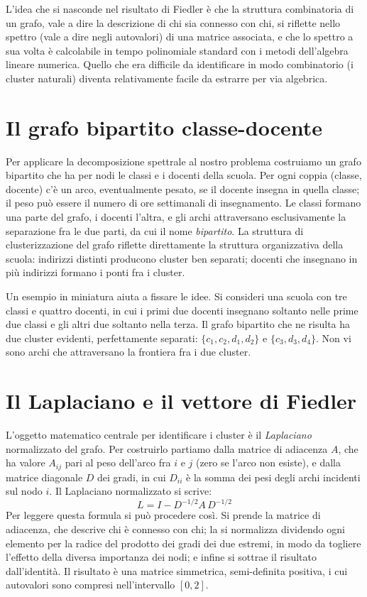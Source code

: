 L'idea che si nasconde nel risultato di Fiedler \`e che la
struttura combinatoria di un grafo, vale a dire la
descrizione di chi sia connesso con chi, si riflette nello
spettro (vale a dire negli autovalori) di una matrice
associata, e che lo spettro a sua volta \`e calcolabile in
tempo polinomiale standard con i metodi dell'algebra
lineare numerica. Quello che era difficile da identificare
in modo combinatorio (i cluster naturali) diventa
relativamente facile da estrarre per via algebrica.

\section{Il grafo bipartito classe-docente}

Per applicare la decomposizione spettrale al nostro problema
costruiamo un grafo bipartito che ha per nodi le classi e i
docenti della scuola. Per ogni coppia (classe, docente) c'\`e
un arco, eventualmente pesato, se il docente insegna in
quella classe; il peso pu\`o essere il numero di ore
settimanali di insegnamento. Le classi formano una parte del
grafo, i docenti l'altra, e gli archi attraversano
esclusivamente la separazione fra le due parti, da cui il
nome \emph{bipartito}. La struttura di clusterizzazione del
grafo riflette direttamente la struttura organizzativa della
scuola: indirizzi distinti producono cluster ben separati;
docenti che insegnano in pi\`u indirizzi formano i ponti fra
i cluster.

Un esempio in miniatura aiuta a fissare le idee. Si consideri
una scuola con tre classi e quattro docenti, in cui i primi
due docenti insegnano soltanto nelle prime due classi e gli
altri due soltanto nella terza. Il grafo bipartito che ne
risulta ha due cluster evidenti, perfettamente separati:
$\{c_1, c_2, d_1, d_2\}$ e $\{c_3, d_3, d_4\}$. Non vi sono
archi che attraversano la frontiera fra i due cluster.

\section{Il Laplaciano e il vettore di Fiedler}

L'oggetto matematico centrale per identificare i cluster \`e
il \emph{Laplaciano} normalizzato del grafo. Per costruirlo
partiamo dalla matrice di adiacenza $A$, che ha valore
$A_{ij}$ pari al peso dell'arco fra $i$ e $j$ (zero se
l'arco non esiste), e dalla matrice diagonale $D$ dei gradi,
in cui $D_{ii}$ \`e la somma dei pesi degli archi incidenti
sul nodo $i$. Il Laplaciano normalizzato si scrive:
\[
  L = I - D^{-1/2} A\, D^{-1/2}
\]
Per leggere questa formula si pu\`o procedere cos\`i. Si
prende la matrice di adiacenza, che descrive chi \`e
connesso con chi; la si normalizza dividendo ogni elemento
per la radice del prodotto dei gradi dei due estremi, in
modo da togliere l'effetto della diversa importanza dei
nodi; e infine si sottrae il risultato dall'identit\`a. Il
risultato \`e una matrice simmetrica, semi-definita
positiva, i cui autovalori sono compresi nell'intervallo
$[0, 2]$.

